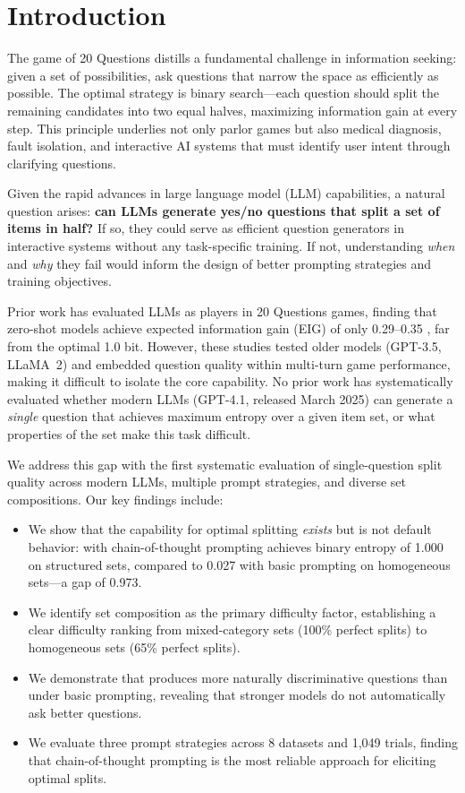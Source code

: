 \section{Introduction}
\label{sec:intro}

The game of 20 Questions distills a fundamental challenge in information seeking: given a set of possibilities, ask questions that narrow the space as efficiently as possible.
The optimal strategy is binary search---each question should split the remaining candidates into two equal halves, maximizing information gain at every step.
This principle underlies not only parlor games but also medical diagnosis, fault isolation, and interactive AI systems that must identify user intent through clarifying questions.

Given the rapid advances in large language model (LLM) capabilities, a natural question arises: \textbf{can LLMs generate yes/no questions that split a set of items in half?}
If so, they could serve as efficient question generators in interactive systems without any task-specific training.
If not, understanding \emph{when} and \emph{why} they fail would inform the design of better prompting strategies and training objectives.

Prior work has evaluated LLMs as players in 20 Questions games, finding that zero-shot models achieve expected information gain (EIG) of only 0.29--0.35 \citep{mazzaccara2024learning}, far from the optimal 1.0 bit.
However, these studies tested older models (GPT-3.5, LLaMA~2) and embedded question quality within multi-turn game performance, making it difficult to isolate the core capability.
No prior work has systematically evaluated whether modern LLMs (GPT-4.1, released March 2025) can generate a \emph{single} question that achieves maximum entropy over a given item set, or what properties of the set make this task difficult.

We address this gap with the first systematic evaluation of single-question split quality across modern LLMs, multiple prompt strategies, and diverse set compositions.
Our key findings include:

\begin{itemize}[leftmargin=*,itemsep=0pt,topsep=0pt]
    \item We show that the capability for optimal splitting \emph{exists} but is not default behavior: \gptfull with chain-of-thought prompting achieves binary entropy of 1.000 on structured sets, compared to 0.027 with basic prompting on homogeneous sets---a gap of 0.973.
    \item We identify set composition as the primary difficulty factor, establishing a clear difficulty ranking from mixed-category sets (100\% perfect splits) to homogeneous sets (65\% perfect splits).
    \item We demonstrate that \gptmini produces more naturally discriminative questions than \gptfull under basic prompting, revealing that stronger models do not automatically ask better questions.
    \item We evaluate three prompt strategies across 8 datasets and 1,049 trials, finding that chain-of-thought prompting is the most reliable approach for eliciting optimal splits.
\end{itemize}


